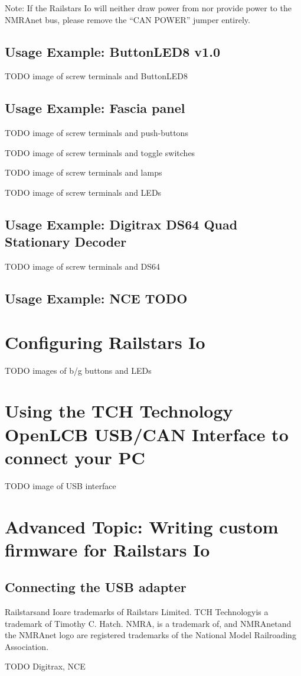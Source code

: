 \documentclass[12pt]{book}
\begin{document}
Note: If the Railstars Io will neither draw power from nor provide power to the NMRAnet bus, please remove the ``CAN POWER'' jumper entirely.

\section{Usage Example: ButtonLED8 v1.0}

TODO image of screw terminals and ButtonLED8

\section{Usage Example: Fascia panel}

TODO image of screw terminals and push-buttons

TODO image of screw terminals and toggle switches

TODO image of screw terminals and lamps

TODO image of screw terminals and LEDs

\section{Usage Example: Digitrax DS64 Quad Stationary Decoder}

TODO image of screw terminals and DS64

\section{Usage Example: NCE TODO}

\chapter{Configuring Railstars Io}

TODO images of b/g buttons and LEDs

\chapter{Using the TCH Technology OpenLCB USB/CAN Interface to connect your PC}

TODO image of USB interface

\chapter{Advanced Topic: Writing custom firmware for Railstars Io}

\section{Connecting the USB adapter}
\label{FTDI}



\printindex

\newpage
Railstars\texttrademark and Io\texttrademark are trademarks of Railstars Limited. TCH Technology\texttrademark is a trademark of Timothy C. Hatch. NMRA\texttrademark, is a trademark of, and NMRAnet\textregistered and the NMRAnet logo are registered trademarks of the National Model Railroading Association.

TODO Digitrax, NCE
\end{document}
